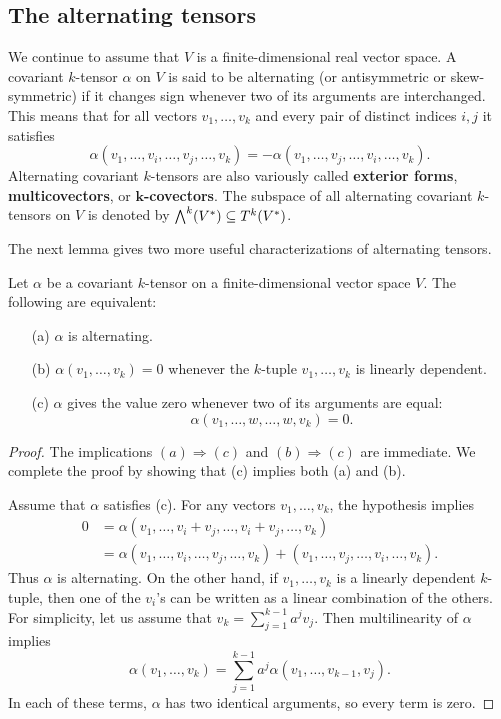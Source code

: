 \subsection{The alternating tensors}
We continue to assume that $V$ is a finite-dimensional real vector space. A covariant $k$-tensor $\alpha$ on $V$ is said to be alternating (or antisymmetric or skew-symmetric) if it changes sign whenever two of its arguments are interchanged. This means that for all vectors $v_1,\dots,v_k$ and every pair of distinct indices $i,j$ it satisfies
\[\alpha(v_1,\dots,v_i,\dots,v_j,\dots,v_k)=-\alpha(v_1,\dots,v_j,\dots,v_i,\dots,v_k).\]
Alternating covariant $k$-tensors are also variously called \textbf{exterior forms}, \textbf{multicovectors}, or \textbf{$\bm{k}$-covectors}. The subspace of all alternating covariant $k$-tensors on $V$ is denoted by $\bigwedge^k(V^*)\subseteq T^k(V^*)$.\par
The next lemma gives two more useful characterizations of alternating tensors.
\begin{lemma}\label{alt tensor lem}
Let $\alpha$ be a covariant $k$-tensor on a finite-dimensional vector space $V$. The following are equivalent:
\begin{itemize}
\item[(a)] $\alpha$ is alternating.
\item[(b)] $\alpha(v_1,\dots,v_k)=0$ whenever the $k$-tuple $v_1,\dots,v_k$ is linearly dependent.
\item[(c)] $\alpha$ gives the value zero whenever two of its arguments are equal:
\[\alpha(v_1,\dots,w,\dots,w,v_k)=0.\]
\end{itemize}
\end{lemma}
\begin{proof}
The implications $(a)\Rightarrow(c)$ and $(b)\Rightarrow(c)$ are immediate. We complete the proof by showing that (c) implies both (a) and (b).\par
Assume that $\alpha$ satisfies (c). For any vectors $v_1,\dots,v_k$, the hypothesis implies
\begin{align*}
0&=\alpha(v_1,\dots,v_i+v_j,\dots,v_i+v_j,\dots,v_k)\\
&=\alpha(v_1,\dots,v_i,\dots,v_j,\dots,v_k)+(v_1,\dots,v_j,\dots,v_i,\dots,v_k).
\end{align*}
Thus $\alpha$ is alternating. On the other hand, if $v_1,\dots,v_k$ is a linearly dependent $k$-tuple, then one of the $v_i$'s can be written as a linear combination of the others. For simplicity, let us assume that $v_k=\sum_{j=1}^{k-1}a^jv_j$. Then multilinearity of $\alpha$ implies
\[\alpha(v_1,\dots,v_k)=\sum_{j=1}^{k-1}a^j\alpha(v_1,\dots,v_{k-1},v_j).\]
In each of these terms, $\alpha$ has two identical arguments, so every term is zero.
\end{proof}
